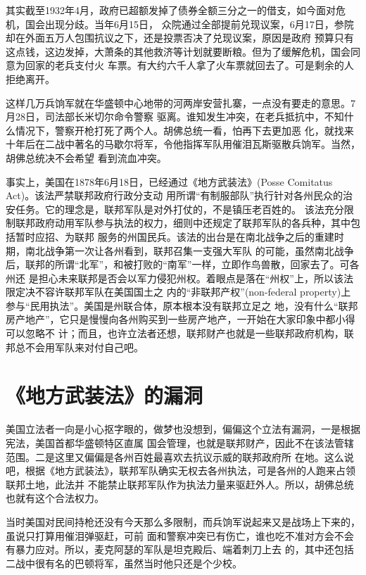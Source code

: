 \documentclass[10pt]{article}
\begin{document}
{其实截至1932年4月，政府已超额发掉了债券全额三分之一的借支，如今面对危机，国会出现分歧。当年6月15日，
众院通过全部提前兑现议案，6月17日，参院却在外面五万人包围抗议之下，还是投票否决了兑现议案，原因是政府
预算只有这点钱，这边发掉，大萧条的其他救济等计划就要断粮。但为了缓解危机，国会同意为回家的老兵支付火
车票。有大约六千人拿了火车票就回去了。可是剩余的人拒绝离开。

这样几万兵饷军就在华盛顿中心地带的河两岸安营扎寨，一点没有要走的意思。7月28日，司法部长米切尔命令警察
驱离。谁知发生冲突，在老兵抵抗中，不知什么情况下，警察开枪打死了两个人。胡佛总统一看，怕再下去更加恶
化，就找来十年后在二战中著名的马歇尔将军，令他指挥军队用催泪瓦斯驱散兵饷军。当然，胡佛总统决不会希望
看到流血冲突。

事实上，美国在1878年6月18日，已经通过《地方武装法》(Posse Comitatus Act)。该法严禁联邦政府行政分支动
用所谓``有制服部队''执行针对各州民众的治安任务。它的理念是，联邦军队是对外打仗的，不是镇压老百姓的。
该法充分限制联邦政府动用军队参与执法的权力，细则中还规定了联邦军队的各兵种，其中包括暂时应招、为联邦
服务的州国民兵。该法的出台是在南北战争之后的重建时期，南北战争第一次让各州看到，联邦召集一支强大军队
的可能，虽然南北战争后，联邦的所谓``北军''，和被打败的``南军''一样，立即作鸟兽散，回家去了。可各州还
是担心未来联邦是否会以军力侵犯州权。着眼点是落在``州权''上，所以该法限定决不容许联邦军队在美国国土之
内的``非联邦产权''(non-federal property)上参与``民用执法''。美国是州联合体，原本根本没有联邦立足之
地，没有什么``联邦房产地产''，它只是慢慢向各州购买到一些房产地产，一开始在大家印象中都小得可以忽略不
计；而且，也许立法者还想，联邦财产也就是一些联邦政府机构，联邦总不会用军队来对付自己吧。

\pagebreak
\section{《地方武装法》的漏洞}

美国立法者一向是小心抠字眼的，做梦也没想到，偏偏这个立法有漏洞，一是根据宪法，美国首都华盛顿特区直属
国会管理，也就是联邦财产，因此不在该法管辖范围。二是这里又偏偏是各州百姓最喜欢去抗议示威的联邦政府所
在地。这么说吧，根据《地方武装法》，联邦军队确实无权去各州执法，可是各州的人跑来占领联邦土地，此法并
不能禁止联邦军队作为执法力量来驱赶外人。所以，胡佛总统也就有这个合法权力。

当时美国对民间持枪还没有今天那么多限制，而兵饷军说起来又是战场上下来的，虽说只打算用催泪弹驱赶，可前
面和警察冲突已有伤亡，谁也吃不准对方会不会有暴力应对。所以，麦克阿瑟的军队是坦克殿后、端着刺刀上去
的，其中还包括二战中很有名的巴顿将军，虽然当时他只还是个少校。

}
\end{document}
